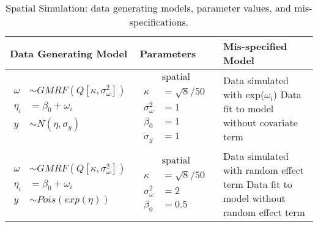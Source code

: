 \begin{table}[h]
    \caption{Spatial Simulation: data generating models, parameter values, and mis-specifications.}
    \begin{tabular}{llp{8cm}}
    \hline
    Data Generating Model & Parameters & Mis-specified Model \\
    \hline
    {$\!\begin{aligned}
    \omega &\sim GMRF(Q[\kappa, \sigma^{2}_{\omega}]) \\
    \eta_{i} &= \beta_{0} + \omega_{i} \\
    y &\sim N(\eta, \sigma_{y})
    \end{aligned}$}
    &
    {$\!\begin{aligned}
    &\text{spatial range = 50} \\
    \kappa &= \sqrt{8}/50\\
    \sigma^{2}_{\omega} &= 1\\
    \beta_{0} &= 1\\
    \sigma_{y} &= 1
    \end{aligned}$}
    &
    Data simulated with exp($\omega_{i}$) \newline
    Data fit to model without covariate term\\
    \hline
    {$\!\begin{aligned}
    \omega &\sim GMRF(Q[\kappa, \sigma^{2}_{\omega}]) \\
    \eta_{i} &= \beta_{0} + \omega_{i} \\
    y &\sim Pois(exp(\eta))
    \end{aligned}$}
    &
    {$\!\begin{aligned}
    &\text{spatial range = 50} \\
    \kappa &= \sqrt{8}/50\\
    \sigma^{2}_{\omega} &= 2\\
    \beta_{0} &= 0.5
    \end{aligned}$}
    &
    Data simulated with random effect term \newline
    Data fit to model without random effect term\\

    \hline
    \end{tabular}
    \end{table}
